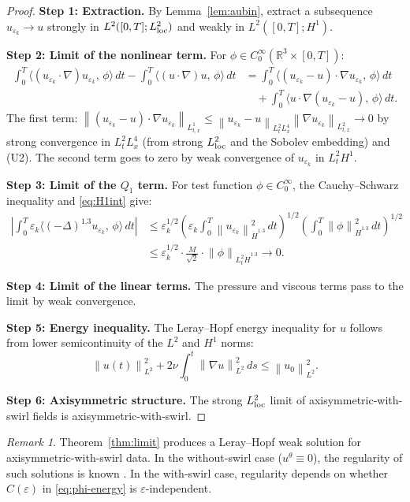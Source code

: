 \documentclass{article}
\theoremstyle{definition}
\theoremstyle{remark}
\newtheorem{remark}[theorem]{Remark}
\newcommand{\R}{\mathbb{R}}
\newcommand{\e}{\varepsilon}
\newcommand{\norm}[1]{\left\|#1\right\|}
\newcommand{\inner}[2]{\langle #1,\, #2\rangle}
\begin{document}
\begin{proof}
  \textbf{Step 1: Extraction.}
  By Lemma~\ref{lem:aubin}, extract a subsequence
  $u_{\e_k}\to u$ strongly in $L^2([0,T];L^2_{\rm loc})$ and weakly
  in $L^2([0,T];H^1)$.

  \textbf{Step 2: Limit of the nonlinear term.}
  For $\phi\in C_0^\infty(\R^3\times[0,T])$:
  \begin{align*}
    \int_0^T\inner{(u_{\e_k}\cdot\nabla)u_{\e_k}}{\phi}\,dt
    -\int_0^T\inner{(u\cdot\nabla)u}{\phi}\,dt
    &= \int_0^T\inner{(u_{\e_k}-u)\cdot\nabla u_{\e_k}}{\phi}\,dt\\
    &\quad + \int_0^T\inner{u\cdot\nabla(u_{\e_k}-u)}{\phi}\,dt.
  \end{align*}
  The first term: $\norm{(u_{\e_k}-u)\cdot\nabla u_{\e_k}}_{L^1_{t,x}}
  \le \norm{u_{\e_k}-u}_{L^2_t L^4_x}\norm{\nabla u_{\e_k}}_{L^2_{t,x}}\to 0$
  by strong convergence in $L^2_t L^4_x$ (from strong $L^2_{\rm loc}$
  and the Sobolev embedding) and (U2).
  The second term goes to zero by weak convergence of $u_{\e_k}$ in
  $L^2_t H^1$.

  \textbf{Step 3: Limit of the $Q_1$ term.}
  For test function $\phi\in C_0^\infty$, the Cauchy--Schwarz inequality and
  \eqref{eq:H1int} give:
  \begin{align*}
    \left|\int_0^T\e_k\inner{(-\Delta)^{1.3}u_{\e_k}}{\phi}\,dt\right|
    &\le \e_k^{1/2}
      \left(\e_k\int_0^T\norm{u_{\e_k}}_{\dot H^{1.3}}^2\,dt\right)^{1/2}
      \left(\int_0^T\norm{\phi}_{\dot H^{1.3}}^2\,dt\right)^{1/2}\\
    &\le \e_k^{1/2}\cdot\frac{M}{\sqrt{2}}
      \cdot\norm{\phi}_{L^2_t \dot H^{1.3}} \to 0.
  \end{align*}

  \textbf{Step 4: Limit of the linear terms.}
  The pressure and viscous terms pass to the limit by weak convergence.

  \textbf{Step 5: Energy inequality.}
  The Leray--Hopf energy inequality for $u$ follows from lower
  semicontinuity of the $L^2$ and $H^1$ norms:
  \[
    \norm{u(t)}_{L^2}^2 + 2\nu\int_0^t\norm{\nabla u}_{L^2}^2\,ds
    \le \norm{u_0}_{L^2}^2.
  \]

  \textbf{Step 6: Axisymmetric structure.}
  The strong $L^2_{\rm loc}$ limit of axisymmetric-with-swirl fields is
  axisymmetric-with-swirl.
\end{proof}

\begin{remark}
  Theorem~\ref{thm:limit} produces a Leray--Hopf weak solution for
  axisymmetric-with-swirl data.  In the without-swirl case ($u^\theta\equiv 0$),
  the regularity of such solutions is known
  \cite{Ladyzhenskaya,UY1968}.  In the with-swirl case, regularity depends
  on whether $C(\e)$ in \eqref{eq:phi-energy} is $\e$-independent.
\end{remark}
\end{document}

